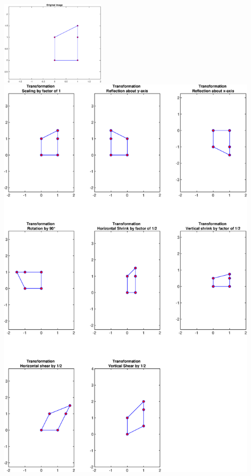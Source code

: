 \documentclass{article}
\begin{document}
\includegraphics [width=2in]{transformations_01.eps}
\vspace{1cm}
\includegraphics [width=5in]{transformations_02.eps}
\end{document}
